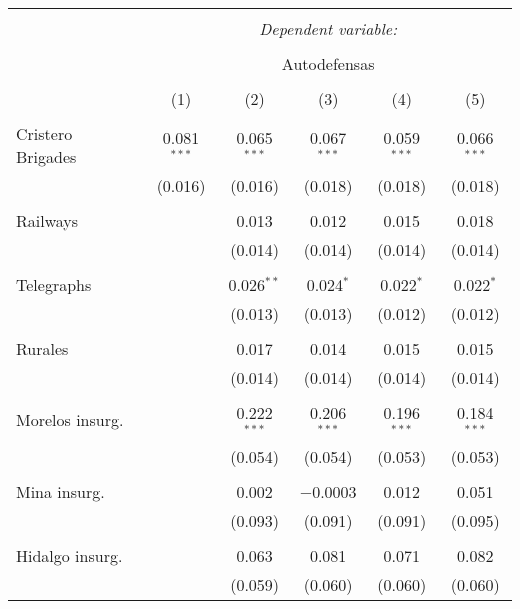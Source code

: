 
\begin{table}[!htbp] \centering 
  \caption{} 
  \label{} 
\begin{tabular}{@{\extracolsep{5pt}}lccccc} 
\\[-1.8ex]\hline 
\hline \\[-1.8ex] 
 & \multicolumn{5}{c}{\textit{Dependent variable:}} \\ 
\cline{2-6} 
\\[-1.8ex] & \multicolumn{5}{c}{Autodefensas} \\ 
\\[-1.8ex] & (1) & (2) & (3) & (4) & (5)\\ 
\hline \\[-1.8ex] 
 Cristero Brigades & 0.081$^{***}$ & 0.065$^{***}$ & 0.067$^{***}$ & 0.059$^{***}$ & 0.066$^{***}$ \\ 
  & (0.016) & (0.016) & (0.018) & (0.018) & (0.018) \\ 
  & & & & & \\ 
 Railways &  & 0.013 & 0.012 & 0.015 & 0.018 \\ 
  &  & (0.014) & (0.014) & (0.014) & (0.014) \\ 
  & & & & & \\ 
 Telegraphs &  & 0.026$^{**}$ & 0.024$^{*}$ & 0.022$^{*}$ & 0.022$^{*}$ \\ 
  &  & (0.013) & (0.013) & (0.012) & (0.012) \\ 
  & & & & & \\ 
 Rurales &  & 0.017 & 0.014 & 0.015 & 0.015 \\ 
  &  & (0.014) & (0.014) & (0.014) & (0.014) \\ 
  & & & & & \\ 
 Morelos insurg. &  & 0.222$^{***}$ & 0.206$^{***}$ & 0.196$^{***}$ & 0.184$^{***}$ \\ 
  &  & (0.054) & (0.054) & (0.053) & (0.053) \\ 
  & & & & & \\ 
 Mina insurg. &  & 0.002 & $-$0.0003 & 0.012 & 0.051 \\ 
  &  & (0.093) & (0.091) & (0.091) & (0.095) \\ 
  & & & & & \\ 
 Hidalgo insurg. &  & 0.063 & 0.081 & 0.071 & 0.082 \\ 
  &  & (0.059) & (0.060) & (0.060) & (0.060) \\ 

\end{tabular}
\end{table}
